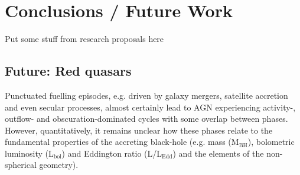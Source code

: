 
\chapter{Conclusions / Future Work}
\label{ch:conclusions} 


Put some stuff from research proposals here 

\section{Future: Red quasars}

Punctuated fuelling episodes, e.g. driven by galaxy mergers, satellite accretion and even secular processes,
almost certainly lead to AGN experiencing activity-, outflow- and obscuration-dominated cycles with some overlap between phases. 
However, quantitatively, it remains unclear how these phases relate to the fundamental properties of the accreting black-hole (e.g.  mass (M$_{\mathrm{BH}}$), bolometric luminosity (L$_{\mathrm{bol}}$) and Eddington ratio (L/L$_{\mathrm{Edd}}$) and the elements of the non-spherical geometry).